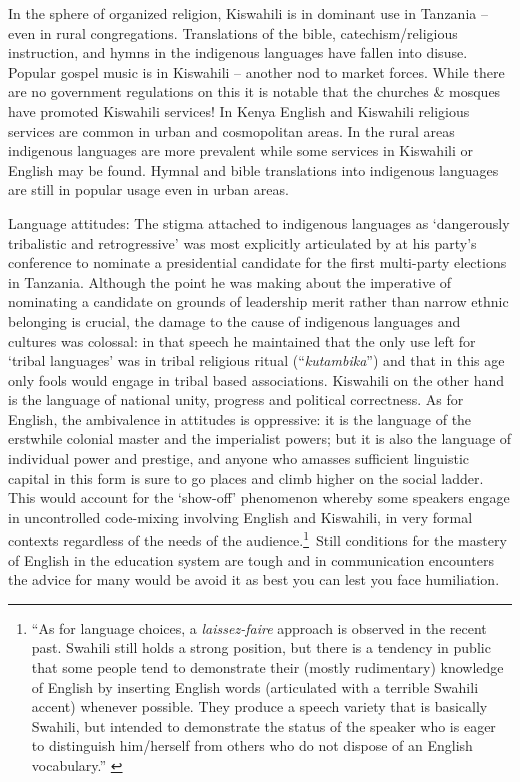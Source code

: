 \documentclass[output=paper,colorlinks,citecolor=brown]{langscibook}
\begin{document}
In the sphere of organized religion, Kiswahili is in dominant use in Tanzania – even in rural congregations.  Translations of the bible, catechism/religious instruction, and hymns in the indigenous languages have fallen into disuse.  Popular gospel music is in Kiswahili – another nod to market forces. While there are no government regulations on this it is notable that the churches \& mosques have promoted Kiswahili services! In Kenya English and Kiswahili religious services are common in urban and cosmopolitan areas. In the rural areas indigenous languages are more prevalent while some services in Kiswahili or English may be found. Hymnal and bible translations into indigenous languages are still in popular usage even in urban areas.

Language attitudes: The stigma attached to indigenous languages as ‘dangerously tribalistic and retrogressive’ was most explicitly articulated by \citet{Nyerere1995} at his party’s conference to nominate a presidential candidate for the first multi-party elections in Tanzania. Although the point he was making about the imperative of nominating a candidate on grounds of leadership merit rather than narrow ethnic belonging is crucial, the damage to the cause of indigenous languages and cultures was colossal: in that speech he maintained that the only use left for ‘tribal languages’ was in tribal religious ritual (“\textit{kutambika}”) and that in this age only fools would engage in tribal based associations. Kiswahili on the other hand is the language of national unity, progress and political correctness. As for English, the ambivalence in attitudes is oppressive: it is the language of the erstwhile colonial master and the imperialist powers; but it is also the language of individual power and prestige, and anyone who amasses sufficient linguistic capital in this form is sure to go places and climb higher on the social ladder. This would account for the ‘show-off’ phenomenon whereby some speakers engage in uncontrolled code-mixing involving English and Kiswahili, in very formal contexts regardless of the needs of the audience.\footnote{“As for language choices, a \textit{laissez-faire} approach is observed in the recent past. Swahili still holds a strong position, but there is a tendency in public that some people tend to demonstrate their (mostly rudimentary) knowledge of English by inserting English words (articulated with a terrible Swahili accent) whenever possible. They produce a speech variety that is basically Swahili, but intended to demonstrate the status of the speaker who is eager to distinguish him/herself from others who do not dispose of an English vocabulary.” \citep[54]{Legere2010}}~Still conditions for the mastery of English in the education system are tough and in communication encounters the advice for many would be avoid it as best you can lest you face humiliation.
\end{document}
